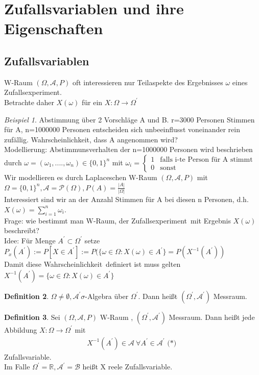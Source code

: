 \documentclass[a4paper,12pt,fleqn]{scrartcl}
\newcommand{\R}{\mathbb{R}}
\newcommand{\m}[1]{\mathcal{ #1 }}
\newcommand{\ZE}{Zufallsexperiment}
\newcommand{\Wk}{Wahrscheinlichkeit}
\newcommand{\ZV}{Zufallsvariable}
\theoremstyle{definition}
\newtheorem{definition}{Definition}[section]
\theoremstyle{plain}
\theoremstyle{remark}
\newtheorem{beispiel}[definition]{Beispiel}
\begin{document}
\section{Zufallsvariablen und ihre Eigenschaften}
\subsection{Zufallsvariablen}
W-Raum $( \Omega , \m{A} , P)$ oft interessieren nur Teilaspekte des Ergebnisses $\omega$ eines \ZE. \\
Betrachte daher $X( \omega ) $ für ein $X : \Omega \rightarrow \Omega^\prime$ \\
\begin{beispiel}
Abstimmung über 2 Vorschläge A und B. r=3000 Personen Stimmen für A, n=1000000 Personen entscheiden sich unbeeinflusst voneinander rein zufällig. \Wk, dass A angenommen wird? \\
Modellierung: Abstimmunsverhalten der n=1000000 Personen wird beschrieben durch $\omega = ( \omega_1, ...., \omega_n) \in \{ 0,1 \}^n$ mit $\omega_i =\begin{cases}1&\text{falls i-te Person für A stimmt}\\0&\text{sonst}\end{cases}$
Wir modellieren es durch Laplaceschen W-Raum $(\Omega , \m{A} , P)$ mit $ \Omega = \{ 0,1 \}^n , \m{A} = \m{P}(\Omega) , P(A) = \frac{|A|}{| \Omega|}$ \\
Interessiert sind wir an der Anzahl Stimmen für A bei diesen n Personen, d.h. $X( \omega) = \sum_{i=1}^{n}{ \omega_i }$. \\
Frage: wie bestimmt man W-Raum, der \ZE \  mit Ergebnis $X( \omega)$ beschreibt? \\
Idee: Für Menge $A^\prime \subset \Omega^\prime$ setze $P_x(A^\prime) := P[X \in A^\prime] := P( \{ \omega \in \Omega : X( \omega ) \in A^\prime \} = P(X^{-1}(A^\prime))$ \\
Damit diese \Wk \ definiert ist muss gelten $X^{-1}(A^\prime) = \{ \omega \in \Omega : X( \omega ) \in A^\prime \}$
\end{beispiel}
\begin{definition}
$\Omega \neq \emptyset , \m{A}^\prime \sigma$-Algebra über $\Omega^\prime$. Dann heißt $(\Omega^\prime, \m{A}^\prime)$ Messraum.
\end{definition}
\begin{definition}
Sei $( \Omega , \m{A} , P)$ W-Raum , $(\Omega^\prime, \m{A}^\prime)$ Messraum. Dann heißt jede Abbildung $X: \Omega \rightarrow \Omega^\prime$ mit
\begin{align*}
 X^{-1}(A^\prime) \in \m{A} \ \forall A^\prime \in \m{A}^\prime \text{ (*) }
\end{align*} 
Zufallsvariable. \\
Im Falle $\Omega^\prime = \R, \m{A}^\prime = \m{B}$ heißt X reele \ZV.
\end{definition}
\end{document}
